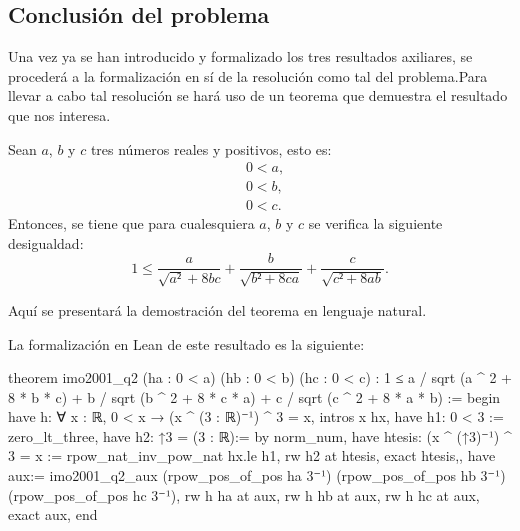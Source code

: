 \subsection{Conclusión del problema}
Una vez ya se han introducido y formalizado los tres resultados
axiliares, se procederá a la formalización en sí de la resolución
como tal del problema.Para llevar a cabo tal resolución se hará uso
de un teorema que demuestra el resultado que nos interesa.

\begin{teorema}
  Sean \(a\), \(b\) y \(c\) tres números reales y positivos, esto es:
  \begin{align}
    &0<a, \label{haq2te}\tag{ha}\\
    &0<b, \label{hbq2te}\tag{hb}\\
    &0<c. \label{hcq2te}\tag{hc}
  \end{align}
  Entonces, se tiene que para cualesquiera \(a\), \(b\) y \(c\) se
  verifica la siguiente desigualdad:
  \begin{equation}
    1≤\frac{a}{\sqrt{a²}+8bc}+\frac{b}{\sqrt{b²+8ca}}+
    \frac{c}{\sqrt{c²+8ab}}.
  \end{equation}
\end{teorema}

\begin{demostracion}
  Aquí se presentará la demostración del teorema en lenguaje
  natural.
\end{demostracion}

La formalización en Lean de este resultado es la siguiente:

\begin{leancode}
theorem imo2001_q2 (ha : 0 < a) (hb : 0 < b) (hc : 0 < c) :
  1 ≤ a / sqrt (a ^ 2 + 8 * b * c) +
      b / sqrt (b ^ 2 + 8 * c * a) +
      c / sqrt (c ^ 2 + 8 * a * b) :=
begin
  have h: ∀ {x : ℝ}, 0 < x → (x ^ (3 : ℝ)⁻¹) ^ 3 = x,
  {intros x hx,
  have h1: 0 < 3 := zero_lt_three, 
  have h2: ↑3 = (3 : ℝ):= by norm_num,
  have htesis: (x ^ (↑3)⁻¹) ^ 3 = x := rpow_nat_inv_pow_nat hx.le h1,
  rw h2 at htesis,
  exact htesis,},
  have aux:= imo2001_q2_aux (rpow_pos_of_pos ha 3⁻¹) 
  (rpow_pos_of_pos hb 3⁻¹) (rpow_pos_of_pos hc 3⁻¹),
  rw h ha at aux,
  rw h hb at aux,
  rw h hc at aux,
  exact aux,
end
\end{leancode}